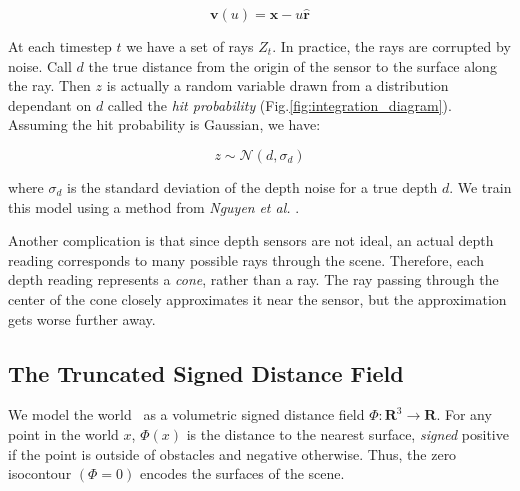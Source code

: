 \documentclass[conference]{IEEEtran}
\newcommand{\figref}[1]{Fig.\ref{#1}}
\newcommand{\etal}{\textit{et al.}\xspace}
\begin{document}
 \begin{equation}
 	\mathbf{v}(u) = \mathbf{x} - u\mathbf{\hat{r}}
 \end{equation}

At each timestep $t$ we have a set of rays $Z_t$. In practice, the rays are
corrupted by noise. Call $d$ the true distance from the origin of the sensor to
the surface along the ray. Then $z$ is actually a random variable drawn from a
distribution dependant on $d$ called the \textit{hit probability}
(\figref{fig:integration_diagram}). Assuming the hit probability is Gaussian, we
have:

\begin{equation}
\label{eqn:hitprobability}
z \sim \mathcal{N}(d, \sigma_d)
\end{equation}

\noindent where $\sigma_d$ is the standard deviation of the depth noise for a
true depth $d$. We train this model using a method from \textit{Nguyen} \etal
\cite{Nguyen2012}.

Another complication is that since depth sensors are not ideal, an actual depth
reading corresponds to many possible rays through the scene. Therefore, each
depth reading represents a \textit{cone}, rather than a ray. The ray passing
through the center of the cone closely approximates it near the sensor, but the
approximation gets worse further away.


\subsection{The Truncated Signed Distance Field}
\label{section:TSDF}
We model the world~\cite{Curless1996} as a volumetric signed distance field $\Phi: \mathbf{R}^3
\to \mathbf{R}$. For any point in the world $x$, $\Phi(x)$
is the distance to the nearest surface, \emph{signed} positive if the point is
outside of obstacles and negative otherwise. Thus, the zero isocontour $(\Phi =
0)$ encodes the surfaces of the scene.
\end{document}

